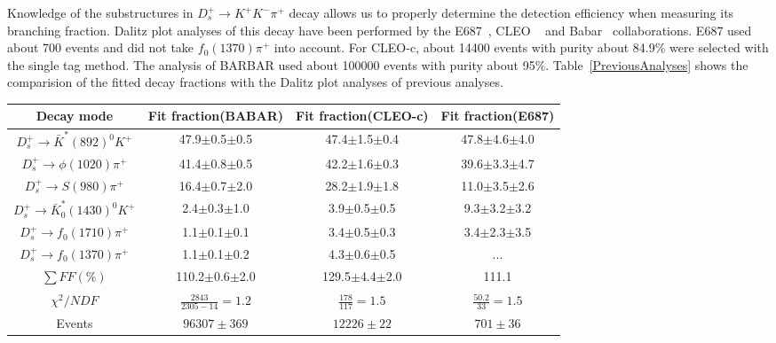 \documentclass[aps,prd,twocolumn,showpacs,amsmath,amssymb]{revtex4-1}
\begin{document}
Knowledge of the substructures in $D_{s}^{+} \rightarrow K^{+}K^{-}\pi^{+}$ decay allows us to properly determine the detection efficiency when measuring its branching fraction.
    Dalitz plot analyses of this decay have been performed by the E687~\cite{E687RES}, CLEO ~\cite{2009CLEO} and Babar~\cite{2011BARBAR} collaborations.
    E687 used about 700 events and did not take $f_{0}(1370)\pi^{+}$ into account. 
    For CLEO-c, about 14400 events with purity about 84.9\% were selected with the single tag method.
    The analysis of BARBAR used about 100000 events with purity about 95\%. 
    Table~\ref{PreviousAnalyses} shows the comparision of the fitted decay fractions with the Dalitz plot analyses of previous analyses.
\begin{table*}[htbp]
    \caption{Comparison between Babar, CLEO-c and E687 Dalitz plot analysis.}
    \label{PreviousAnalyses}
    \begin{center}
        \begin{tabular}{cccc}
            \hline\hline
            Decay mode & Fit fraction(BABAR)  & Fit fraction(CLEO-c)  & Fit fraction(E687)\\
            \midrule
            $D_{s}^{+} \rightarrow \bar{K}^{*}(892)^{0}K^{+}$              & 47.9$\pm$0.5$\pm$0.5  & 47.4$\pm$1.5$\pm$0.4& 47.8$\pm$4.6$\pm$4.0 \\
            $D_{s}^{+} \rightarrow \phi(1020)\pi^{+}$                      & 41.4$\pm$0.8$\pm$0.5  & 42.2$\pm$1.6$\pm$0.3& 39.6$\pm$3.3$\pm$4.7 \\
            $D_{s}^{+} \rightarrow S(980)\pi^{+}$    & 16.4$\pm$0.7$\pm$2.0  & 28.2$\pm$1.9$\pm$1.8& 11.0$\pm$3.5$\pm$2.6 \\
            $D_{s}^{+} \rightarrow \bar{K}^{*}_{0}(1430)^{0}K^{+}$         & 2.4$\pm$0.3$\pm$1.0   & 3.9$\pm$0.5$\pm$0.5 & 9.3$\pm$3.2$\pm$3.2  \\
            $D_{s}^{+} \rightarrow f_{0}(1710)\pi^{+}$                     & 1.1$\pm$0.1$\pm$0.1   & 3.4$\pm$0.5$\pm$0.3 & 3.4$\pm$2.3$\pm$3.5  \\
            $D_{s}^{+} \rightarrow f_{0}(1370)\pi^{+}$                     & 1.1$\pm$0.1$\pm$0.2   & 4.3$\pm$0.6$\pm$0.5 & ...                  \\ 
            $\begin{matrix}\sum FF(\%)\end{matrix}$                          & 110.2$\pm$0.6$\pm$2.0 & 129.5$\pm$4.4$\pm$2.0 & 111.1\\
                \midrule
                $\chi^{2}/NDF$                                                  & $\frac{2843}{2305-14}=1.2$ & $\frac{178}{117}=1.5$ & $\frac{50.2}{33}=1.5$\\
                \midrule
                Events                                                         &$96307\pm369$          &$12226\pm22$  &$701\pm36$\\
                \hline\hline
            \end{tabular}
        \end{center}
    \end{table*}
\end{document}
